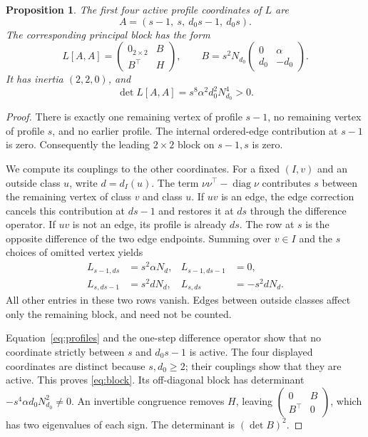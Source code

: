 \documentclass[11pt]{article}
\newtheorem{proposition}[theorem]{Proposition}
\theoremstyle{remark}\newtheorem{remark}[theorem]{Remark}
\DeclareMathOperator{\diag}{diag}
\begin{document}
\begin{proposition}\label{prop:block}
The first four active profile coordinates of $L$ are
\[
 A=(s-1,\ s,\ d_0s-1,\ d_0s).
\]
The corresponding principal block has the form
\begin{equation}
 L[A,A]=
 \begin{pmatrix}0_{2\times2}&B\\B^\top&H\end{pmatrix},
 \qquad
 B=s^2N_{d_0}
 \begin{pmatrix}0&\alpha\\d_0&-d_0\end{pmatrix}. \label{eq:block}
\end{equation}
It has inertia $(2,2,0)$, and
\[
 \det L[A,A]=s^8\alpha^2d_0^2N_{d_0}^4>0.
\]
\end{proposition}
\begin{proof}
There is exactly one remaining vertex of profile $s-1$, no
remaining vertex of profile $s$, and no earlier profile.
The internal ordered-edge contribution at $s-1$ is zero.
Consequently the leading $2\times2$ block on $s-1,s$ is zero.

We compute its couplings to the other coordinates. For a fixed
$(I,v)$ and an outside class $u$, write $d=d_I(u)$.
The term $\nu\nu^\top-\diag\nu$ contributes $s$ between the
remaining vertex of class $v$ and class $u$.
If $uv$ is an edge, the edge correction cancels this contribution
at $ds-1$ and restores it at $ds$ through the difference operator.
If $uv$ is not an edge, its profile is already $ds$.
The row at $s$ is the opposite difference of the two edge endpoints.
Summing over $v\in I$ and the $s$ choices of omitted vertex yields
\begin{align}
 L_{s-1,ds}&=s^2\alpha N_d,&
 L_{s-1,ds-1}&=0, \label{eq:row1}\\
 L_{s,ds-1}&=s^2dN_d,&
 L_{s,ds}&=-s^2dN_d. \label{eq:row2}
\end{align}
All other entries in these two rows vanish. Edges between outside
classes affect only the remaining block, and need not be counted.

Equation~\eqref{eq:profiles} and the one-step difference operator
show that no coordinate strictly between $s$ and $d_0s-1$ is active.
The four displayed coordinates are distinct because $s,d_0\ge2$;
their couplings show that they are active. This proves
\eqref{eq:block}. Its off-diagonal block has determinant
$-s^4\alpha d_0N_{d_0}^2\ne0$.
An invertible congruence removes $H$, leaving
$\left(\begin{smallmatrix}0&B\\B^\top&0\end{smallmatrix}\right)$,
which has two eigenvalues of each sign.
The determinant is $(\det B)^2$.
\end{proof}
\end{document}
